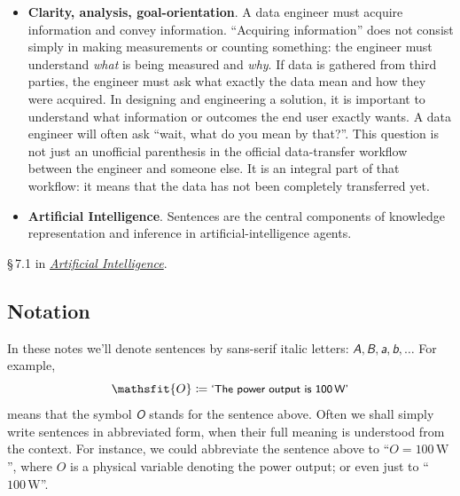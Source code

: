 \documentclass[
  a4paper,
  DIV=11,
  numbers=noendperiod,
  oneside]{scrreprt}
\begin{document}
\begin{itemize}
\item
  \textbf{Clarity, analysis, goal-orientation}. A data engineer must
  acquire information and convey information. ``Acquiring information''
  does not consist simply in making measurements or counting something:
  the engineer must understand \emph{what} is being measured and
  \emph{why}. If data is gathered from third parties, the engineer must
  ask what exactly the data mean and how they were acquired. In
  designing and engineering a solution, it is important to understand
  what information or outcomes the end user exactly wants. A data
  engineer will often ask ``wait, what do you mean by that?''. This
  question is not just an unofficial parenthesis in the official
  data-transfer workflow between the engineer and someone else. It is an
  integral part of that workflow: it means that the data has not been
  completely transferred yet.
\item
  \textbf{Artificial Intelligence}. Sentences are the central components
  of knowledge representation and inference in artificial-intelligence
  agents.
\end{itemize}

\begin{tcolorbox}[enhanced jigsaw, opacitybacktitle=0.6, bottomrule=.15mm, opacityback=0, toprule=.15mm, breakable, colframe=quarto-callout-caution-color-frame, titlerule=0mm, toptitle=1mm, rightrule=.15mm, leftrule=.75mm, bottomtitle=1mm, coltitle=black, colbacktitle=quarto-callout-caution-color!10!white, title={\faIcon{book-open} Reading}, arc=.35mm, left=2mm, colback=white]

§\,7.1 in
\href{https://hvl.instructure.com/courses/25074/modules/items/660089}{\emph{Artificial
Intelligence}}.

\end{tcolorbox}

\hypertarget{notation}{%
\subsection{Notation}\label{notation}}

In these notes we'll denote sentences by sans-serif italic letters:
\(\mathsfit{A},\mathsfit{B},\mathsfit{a},\mathsfit{b},\dotsc\) For
example, \[
\mathsfit{O} \coloneqq \textsf{\small`The power output is 100\,W'}
\] means that the symbol \(\mathsfit{O}\) stands for the sentence above.
Often we shall simply write sentences in abbreviated form, when their
full meaning is understood from the context. For instance, we could
abbreviate the sentence above to {``\(O = 100\,\mathrm{W}\)''}, where
\(O\) is a physical variable denoting the power output; or even just to
{``\(100\,\mathrm{W}\)''}.
\end{document}
